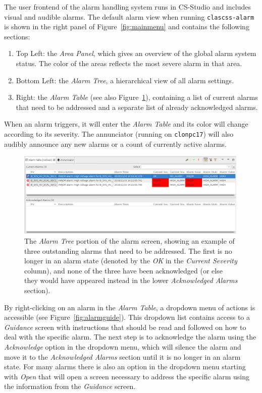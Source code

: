\documentclass[amsmath,amssymb,notitlepage,11pt]{revtex4}
\begin{document}
The user frontend of the alarm handling system runs in CS-Studio and includes visual and audible alarms.  The default alarm view when running \texttt{clascss-alarm} is shown in the right panel of Figure~\ref{fig:mainmenu} and contains the following sections:
\begin{enumerate}
    \item Top Left:  the {\em Area Panel}, which gives an overview of the global alarm system status.  The color of the areas reflects the most severe alarm in that area.
    \item Bottom Left:  the {\em Alarm Tree}, a hierarchical view of all alarm settings.
    \item  Right:  the {\em Alarm Table} (see also Figure~\ref{fig:alarmtable}), containing a list of current alarms that need to be addressed and a separate list of already acknowledged alarms.
\end{enumerate}
When an alarm triggers, it will enter the {\em Alarm Table} and its color will change according to its severity.  The annunciator (running on \texttt{clonpc17}) will also audibly announce any new alarms or a count of currently active alarms.
\begin{figure}[htbp]\centering
  \includegraphics[width=0.99\textwidth]{pics/alarmtree}
  \caption{The {\em Alarm Tree} portion of the alarm screen, showing an example of three outstanding alarms that need to be addressed.  The first is no longer in an alarm state (denoted by the {\em OK} in the {\em Current Severity} column), and none of the three have been acknowledged (or else they would have appeared instead in the lower {\em Acknowledged Alarms} section).\label{fig:alarmtable}}
\end{figure}

By right-clicking on an alarm in the {\em Alarm Table}, a dropdown menu of actions is accessible (see Figure~\ref{fig:alarmguide}).  This dropdown list contains access to a {\em Guidance} screen with instructions that should be read and followed on how to deal with the specific alarm.  The next step is to acknowledge the alarm using the {\em Acknowledge} option in the dropdown menu, which will silence the alarm and move it to the {\em Acknowledged Alarms} section until it is no longer in an alarm state.  For many alarms there is also an option in the dropdown menu starting with {\em Open} that will open a screen necessary to address the specific alarm using the information from the {\em Guidance} screen.
\end{document}
